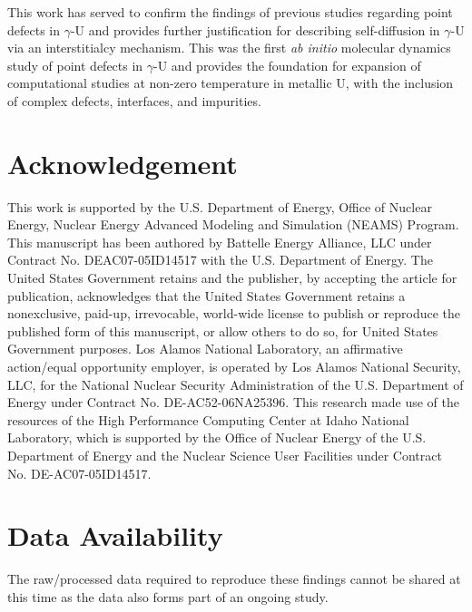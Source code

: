 \documentclass[review]{elsarticle}
\begin{document}
This work has served to confirm the findings of previous studies regarding point defects in $\gamma$-U and provides further justification for describing self-diffusion in $\gamma$-U via an interstitialcy mechanism. This was the first \textit{ab initio} molecular dynamics study of point defects in $\gamma$-U and provides the foundation for expansion of computational studies at non-zero temperature in metallic U, with the inclusion of complex defects, interfaces, and impurities.

\section{Acknowledgement}
This work is supported by the U.S. Department of Energy, Office of Nuclear Energy, Nuclear Energy Advanced Modeling and Simulation (NEAMS) Program. This manuscript has been authored by Battelle Energy Alliance, LLC under Contract No. DEAC07-05ID14517 with the U.S. Department of Energy. The United States Government retains and the publisher, by accepting the article for publication, acknowledges that the United States Government retains a nonexclusive, paid-up, irrevocable, world-wide license to publish or reproduce the published form of this manuscript, or allow others to do so, for United States Government purposes.  Los Alamos National Laboratory, an affirmative action/equal opportunity employer, is operated by Los Alamos National Security, LLC, for the National Nuclear Security Administration of the U.S. Department of Energy under Contract No. DE-AC52-06NA25396.  This research made use of the resources of the High Performance Computing Center at Idaho National Laboratory, which is supported by the Office of Nuclear Energy of the U.S. Department of Energy and the Nuclear Science User Facilities under Contract No. DE-AC07-05ID14517.


\section{Data Availability}

The raw/processed data required to reproduce these findings cannot be shared at this time as the data also forms part of an ongoing study.
\end{document}
